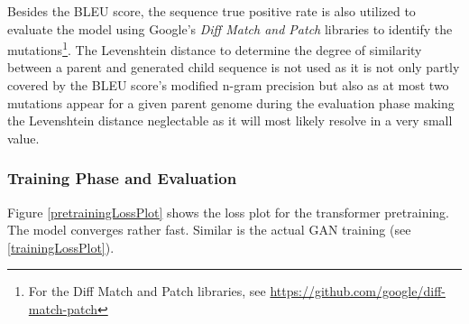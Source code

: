 Besides the \ac{BLEU} score, the sequence true positive rate is also utilized to evaluate the model using Google's \textit{Diff Match and Patch} libraries to identify the mutations\footnote{For the Diff Match and Patch libraries, see \url{https://github.com/google/diff-match-patch}}. The Levenshtein distance to determine the degree of similarity between a parent and generated child sequence is not used as it is not only partly covered by the \ac{BLEU} score's modified n-gram precision but also as at most two mutations appear for a given parent genome during the evaluation phase making the Levenshtein distance neglectable as it will most likely resolve in a very small value. 

\subsubsection{Training Phase and Evaluation} \label{ch:experimentsBb}

Figure \ref{pretrainingLossPlot} shows the loss plot for the transformer pretraining. The model converges rather fast. Similar is the actual \ac{GAN} training (see \ref{trainingLossPlot}). 

